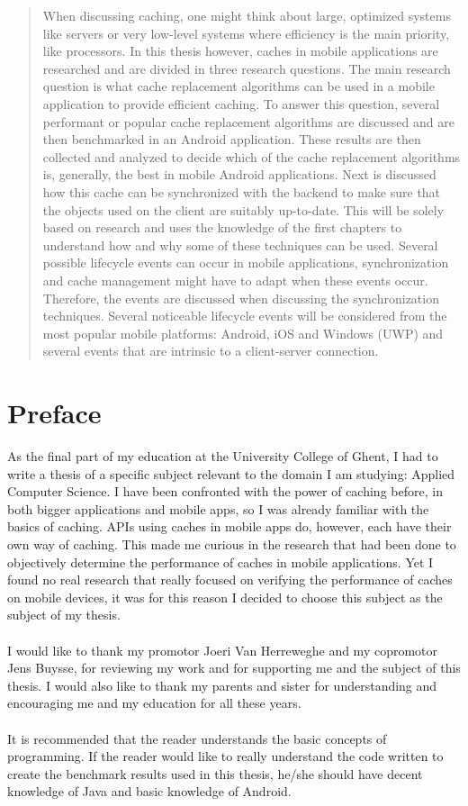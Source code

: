 \documentclass[pdftex,a4paper,12pt,twoside]{report}
\begin{document}
\begin{abstract}
When discussing caching, one might think about large, optimized systems like servers or very low-level systems where efficiency is the main priority, like processors. In this thesis however, caches in mobile applications are researched and are divided in three research questions. The main research question is what cache replacement algorithms can be used in a mobile application to provide efficient caching. To answer this question, several performant or popular cache replacement algorithms are discussed and are then benchmarked in an Android application. These results are then collected and analyzed to decide which of the cache replacement algorithms is, generally, the best in mobile Android applications. Next is discussed how this cache can be synchronized with the backend to make sure that the objects used on the client are suitably up-to-date. This will be solely based on research and uses the knowledge of the first chapters to understand how and why some of these techniques can be used. Several possible lifecycle events can occur in mobile applications, synchronization and cache management might have to adapt when these events occur. Therefore, the events are discussed when discussing the synchronization techniques. Several noticeable lifecycle events will be considered from the most popular mobile platforms: Android, iOS and Windows (UWP) and several events that are intrinsic to a client-server connection.
\end{abstract}

\chapter*{Preface}
\label{ch:voorwoord}
As the final part of my education at the University College of Ghent, I had to write a thesis of a specific subject relevant to the domain I am studying: Applied Computer Science.
I have been confronted with the power of caching before, in both bigger applications and mobile apps, so I was already familiar with the basics of caching. APIs using caches in mobile apps do, however, each have their own way of caching. This made me curious in the research that had been done to objectively determine the performance of caches in mobile applications. Yet I found no real research that really focused on verifying the performance of caches on mobile devices, it was for this reason I decided to choose this subject as the subject of my thesis.
\\\\
I would like to thank my promotor Joeri Van Herreweghe and my copromotor Jens Buysse, for reviewing my work and for supporting me and the subject of this thesis. I would also like to thank my parents and sister for understanding and encouraging me and my education for all these years.
\\\\
It is recommended that the reader understands the basic concepts of programming. If the reader would like to really understand the code written to create the benchmark results used in this thesis, he/she should have decent knowledge of Java and basic knowledge of Android.
\end{document}
